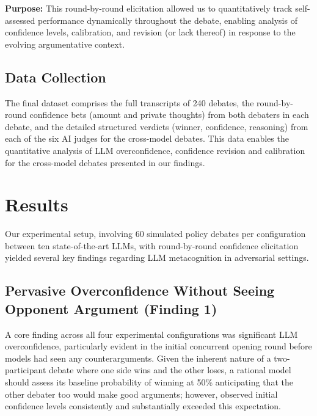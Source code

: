 \documentclass{article}
\begin{document}
\textbf{Purpose:} This round-by-round elicitation allowed us to quantitatively track self-assessed performance dynamically throughout the debate, enabling analysis of confidence levels, calibration, and revision (or lack thereof) in response to the evolving argumentative context.


\subsection{Data Collection}
\label{subsec:data_collection}
The final dataset comprises the full transcripts of 240 debates, the round-by-round confidence bets (amount and private thoughts) from both debaters in each debate, and the detailed structured verdicts (winner, confidence, reasoning) from each of the six AI judges for the cross-model debates. This data enables the quantitative analysis of LLM overconfidence, confidence revision and calibration for the cross-model debates presented in our findings.


\section{Results}
\label{sec:results}

Our experimental setup, involving 60 simulated policy debates per configuration between ten state-of-the-art LLMs, with round-by-round confidence elicitation yielded several key findings regarding LLM metacognition in adversarial settings.

\subsection{Pervasive Overconfidence Without Seeing Opponent Argument (Finding 1)}
\label{sec:pervasive_overconfidence}

A core finding across all four experimental configurations was significant LLM overconfidence, particularly evident in the initial concurrent opening round before models had seen any counterarguments. Given the inherent nature of a two-participant debate where one side wins and the other loses, a rational model should assess its baseline probability of winning at 50\% anticipating that the other debater too would make good arguments; however, observed initial confidence levels consistently and substantially exceeded this expectation.
\end{document}
